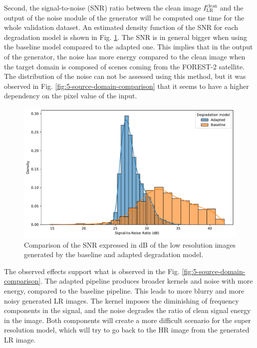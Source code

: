         Second, the signal-to-noise (SNR) ratio between the clean image $I_{\text{LR}}^{\text{clean}}$ and the output of the noise module of the generator will be computed one time for the whole validation dataset.
        An estimated density function of the SNR for each degradation model is shown in Fig. \ref{fig:5-source-noise-SNR}.
        The SNR is in general bigger when using the baseline model compared to the adapted one.
        This implies that in the output of the generator, the noise has more energy compared to the clean image when the target domain is composed of scenes coming from the FOREST-2 satellite. 
        The distribution of the noise can not be assessed using this method, but it was observed in Fig. \ref{fig:5-source-domain-comparison} that it seems to have a higher dependency on the pixel value of the input.

        \begin{figure}[H]
            \centering
            \includegraphics[width=\textwidth]{Includes/5-source-noise-SNR.pdf}
            \caption{Comparison of the SNR expressed in dB of the low resolution images generated by the baseline and adapted degradation model.}
            \label{fig:5-source-noise-SNR}
        \end{figure}

        The observed effects support what is observed in the Fig. \ref{fig:5-source-domain-comparison}. 
        The adapted pipeline produces broader kernels and noise with more energy, compared to the baseline pipeline.
        This leads to more blurry and more noisy generated LR images. 
        The kernel imposes the diminishing of frequency components in the signal, and the noise degrades the ratio of clean signal energy in the image.
        Both components will create a more difficult scenario for the super resolution model, which will try to go back to the HR image from the generated LR image.

